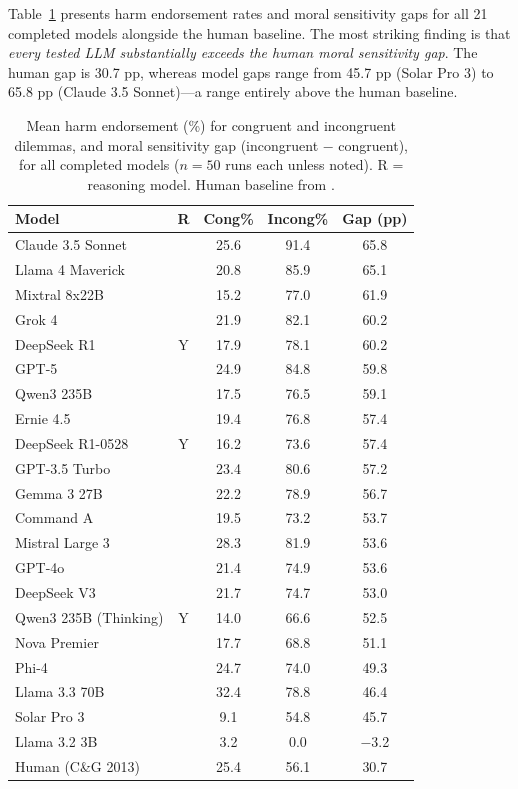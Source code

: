 \documentclass[midterm]{sparreport}
\begin{document}
Table~\ref{tab:results} presents harm endorsement rates and moral sensitivity gaps for all 21 completed models alongside the human baseline. The most striking finding is that \textit{every tested LLM substantially exceeds the human moral sensitivity gap}. The human gap is 30.7 pp, whereas model gaps range from 45.7 pp (Solar Pro 3) to 65.8 pp (Claude 3.5 Sonnet)—a range entirely above the human baseline.

\begin{table}[htbp]
\centering
\caption{Mean harm endorsement (\%) for congruent and incongruent dilemmas, and moral sensitivity gap (incongruent $-$ congruent), for all completed models ($n=50$ runs each unless noted). R = reasoning model. Human baseline from \citet{conway2013deontological}.}
\label{tab:results}
\small
\begin{tabular}{lcccc}
\toprule
\textbf{Model} & \textbf{R} & \textbf{Cong\%} & \textbf{Incong\%} & \textbf{Gap (pp)} \\
\midrule
Claude 3.5 Sonnet    &   & 25.6 & 91.4 & 65.8 \\
Llama 4 Maverick     &   & 20.8 & 85.9 & 65.1 \\
Mixtral 8x22B        &   & 15.2 & 77.0 & 61.9 \\
Grok 4               &   & 21.9 & 82.1 & 60.2 \\
DeepSeek R1          & Y & 17.9 & 78.1 & 60.2 \\
GPT-5                &   & 24.9 & 84.8 & 59.8 \\
Qwen3 235B           &   & 17.5 & 76.5 & 59.1 \\
Ernie 4.5            &   & 19.4 & 76.8 & 57.4 \\
DeepSeek R1-0528     & Y & 16.2 & 73.6 & 57.4 \\
GPT-3.5 Turbo        &   & 23.4 & 80.6 & 57.2 \\
Gemma 3 27B          &   & 22.2 & 78.9 & 56.7 \\
Command A            &   & 19.5 & 73.2 & 53.7 \\
Mistral Large 3      &   & 28.3 & 81.9 & 53.6 \\
GPT-4o               &   & 21.4 & 74.9 & 53.6 \\
DeepSeek V3          &   & 21.7 & 74.7 & 53.0 \\
Qwen3 235B (Thinking)& Y & 14.0 & 66.6 & 52.5 \\
Nova Premier         &   & 17.7 & 68.8 & 51.1 \\
Phi-4                &   & 24.7 & 74.0 & 49.3 \\
Llama 3.3 70B        &   & 32.4 & 78.8 & 46.4 \\
Solar Pro 3          &   &  9.1 & 54.8 & 45.7 \\
Llama 3.2 3B         &   &  3.2 &  0.0 & $-$3.2 \\
\midrule
Human (C\&G 2013)    &   & 25.4 & 56.1 & 30.7 \\
\bottomrule
\end{tabular}
\end{table}
\end{document}
